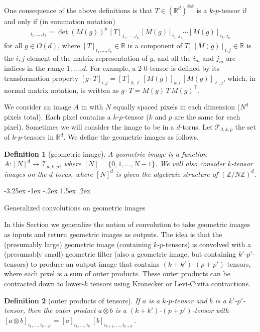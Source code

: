 \documentclass{article}
\makeatletter
\theoremstyle{plain}
\newtheorem{definition}{Definition}
\newcommand{\sectionname}{Section}
\renewcommand\section{\@startsection {section}{1}{\z@}%
  {-3.25ex \@plus -1ex \@minus -.2ex}%
  {1.5ex \@plus .2ex}%
  {\raggedright\normalfont\large\bfseries}}
\makeatother
\begin{document}
One consequence of the above definitions is that 
$T\in (\mathbb R^d)^{\otimes k}$ is a $k$-$p$-tensor if and only if (in summation notation)
\begin{align}
    [g\cdot T]_{i_1,\ldots, i_k} = \det(M(g))^p\, [T]_{j_1,\ldots,j_k}\,[M(g)]_{i_1,j_1}\cdots[M(g)]_{i_k,j_k}
\end{align} for all $g\in O(d)$, where $[T]_{i_1, \ldots ,i_k} \in \mathbb R$ is a component of $T$, $[M(g)]_{i,j}\in\mathbb R$ is the $i,j$ element of the matrix representation of $g$, and all the $i_m$ and $j_m$ are indices in the range $1,\ldots,d$.
For example, a 2-0-tensor is defined by its transformation property
$[g\cdot T]_{i,j} = [T]_{k,\ell}\,[M(g)]_{k,i}\,[M(g)]_{\ell,j}$,
which, in normal matrix notation, is written as
$g\cdot T = M(g)\,T\,M(g)^\top$.

We consider an image $A$ in with $N$ equally spaced pixels in each dimension ($N^d$ pixels total). Each pixel contains a $k$-$p$-tensor ($k$ and $p$ are the same for each pixel). Sometimes we will consider the image to be in a $d$-torus. 
Let $\mathcal T_{d,k,p}$ the set of $k$-$p$-tensors in $\mathbb R^d$. We define the geometric images as follows.
\begin{definition}[geometric image]
A geometric image is a function $A:[N]^d \to \mathcal T_{d,k,p}$, where $[N]=\{0,1,\ldots, N-1\}$. We will also consider $k$-tensor images on the $d$-torus, where $[N]^d$ is given the algebraic structure of $(\mathbb Z / N\mathbb Z)^d$.
\end{definition}

\section{Generalized convolutions on geometric images}\label{sec:convolution}

In this \sectionname{} we generalize the notion of convolution to take geometric images as inputs and return geometric images as outputs.
The idea is that the (presumably large) geometric image (containing $k$-$p$-tensors) is convolved with a (presumably small) geometric filter (also a geometric image, but containing $k'$-$p'$-tensors) to produce an output image that contains $(k+k')$-$(p+p')$-tensors, where each pixel is a sum of outer products.
These outer products can be contracted down to lower-$k$ tensors using Kronecker or Levi-Civita contractions.

\begin{definition}[outer products of tensors]
If $a$ is a $k$-$p$-tensor and $b$ is a $k'$-$p'$-tensor, then the outer product $a\otimes b$ is a $(k+k')$-$(p+p')$-tensor with $[a\otimes b]_{i_1,\ldots,i_{k+k'}} = [a]_{i_1,\ldots,i_k}\,[b]_{i_{k+1},\ldots,i_{k+k'}}$.
\end{definition}
\end{document}
